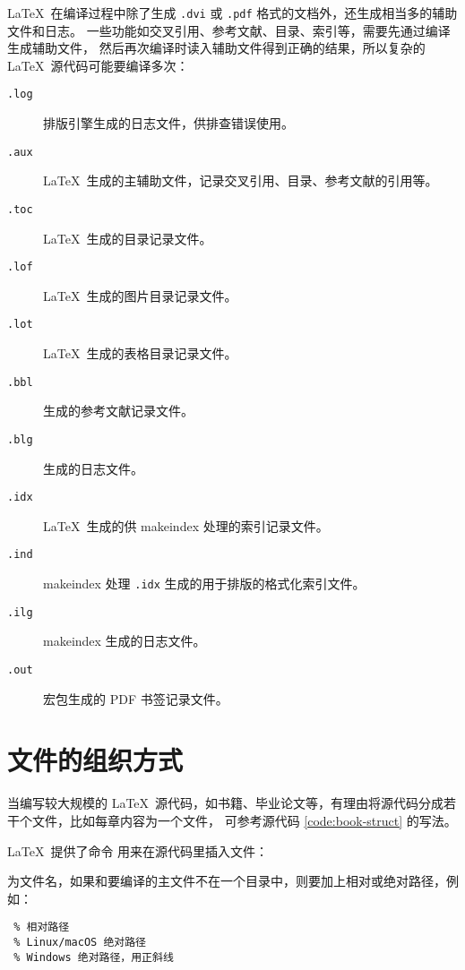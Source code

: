 \LaTeX\ 在编译过程中除了生成 \texttt{.dvi} 或 \texttt{.pdf} 格式的文档外，还生成相当多的辅助文件和日志。
一些功能如交叉引用、参考文献、目录、索引等，需要先通过编译生成辅助文件，
然后再次编译时读入辅助文件得到正确的结果，所以复杂的 \LaTeX\ 源代码可能要编译多次：
\begin{description}
  \item[\texttt{.log}] 排版引擎生成的日志文件，供排查错误使用。
  \item[\texttt{.aux}] \LaTeX\ 生成的主辅助文件，记录交叉引用、目录、参考文献的引用等。
  \item[\texttt{.toc}] \LaTeX\ 生成的目录记录文件。
  \item[\texttt{.lof}] \LaTeX\ 生成的图片目录记录文件。
  \item[\texttt{.lot}] \LaTeX\ 生成的表格目录记录文件。
  \item[\texttt{.bbl}]  生成的参考文献记录文件。
  \item[\texttt{.blg}]  生成的日志文件。
  \item[\texttt{.idx}] \LaTeX\ 生成的供 makeindex 处理的索引记录文件。
  \item[\texttt{.ind}] makeindex 处理 \texttt{.idx} 生成的用于排版的格式化索引文件。
  \item[\texttt{.ilg}] makeindex 生成的日志文件。
  \item[\texttt{.out}]  宏包生成的 PDF 书签记录文件。
\end{description}

\section{文件的组织方式}\label{sec:latex-multi-files}

当编写较大规模的 \LaTeX\ 源代码，如书籍、毕业论文等，有理由将源代码分成若干个文件，比如每章内容为一个文件，
可参考源代码 \ref{code:book-struct} 的写法。

\LaTeX\ 提供了命令  用来在源代码里插入文件：
\begin{command}
\end{command}
 为文件名，如果和要编译的主文件不在一个目录中，则要加上相对或绝对路径，例如：
\begin{verbatim}
 % 相对路径
 % Linux/macOS 绝对路径
 % Windows 绝对路径，用正斜线
\end{verbatim}

